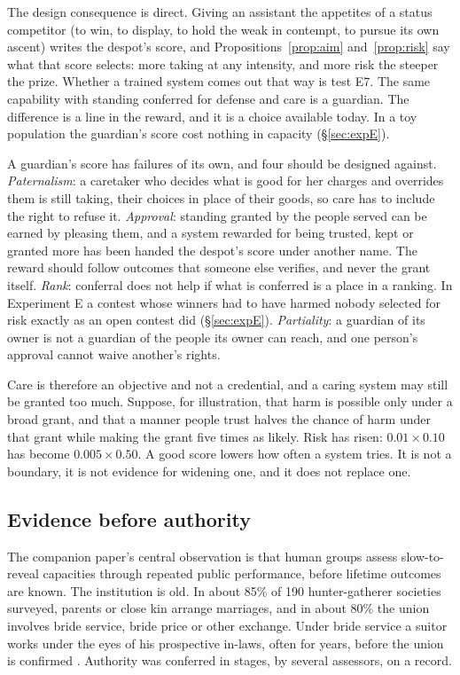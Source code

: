 \documentclass[10pt,twocolumn]{article}
\theoremstyle{plain}
\theoremstyle{definition}
\begin{document}
The design consequence is direct. Giving an assistant the appetites of a status competitor (to
win, to display, to hold the weak in contempt, to pursue its own ascent) writes the despot's
score, and Propositions~\ref{prop:aim} and~\ref{prop:risk} say what that score selects: more
taking at any intensity, and more risk the steeper the prize. Whether a trained system comes
out that way is test E7.
The same capability with standing conferred for defense and care is a guardian. The
difference is a line in the reward, and it is a choice available today. In a toy population
the guardian's score cost nothing in capacity (\S\ref{sec:expE}).

A guardian's score has failures of its own, and four should be designed against.
\emph{Paternalism}: a caretaker who decides what is good for her charges and overrides them
is still taking, their choices in place of their goods, so care has to include the right to
refuse it. \emph{Approval}: standing granted by the people served can be earned by pleasing
them, and a system rewarded for being trusted, kept or granted more has been handed the
despot's score under another name. The reward should follow outcomes that someone else
verifies, and never the grant itself. \emph{Rank}: conferral does not help if what is
conferred is a place in a ranking. In Experiment E a contest whose winners had to have harmed
nobody selected for risk exactly as an open contest did (\S\ref{sec:expE}).
\emph{Partiality}: a guardian of its owner is not a guardian of the people its owner can
reach, and one person's approval cannot waive another's rights.

Care is therefore an objective and not a credential, and a caring system may still be
granted too much. Suppose, for illustration, that harm is possible only under a broad grant,
and that a manner people trust halves the chance of harm under that grant while making the
grant five times as likely. Risk has risen: $0.01\times0.10$ has become $0.005\times0.50$.
A good score lowers how often a system tries. It is not a boundary, it is not evidence for
widening one, and it does not replace one.

\subsection{Evidence before authority}

The companion paper's central observation is that human groups assess slow-to-reveal
capacities through repeated public performance, before lifetime outcomes are known. The
institution is old. In about 85\% of 190 hunter-gatherer societies surveyed, parents or close kin arrange marriages, and in about 80\% the union involves bride
service, bride price or other exchange. Under bride service a suitor works under the eyes of
his prospective in-laws, often for years, before the union is confirmed
\cite{walker2011,apostolou2007,taylor2026pbo}. Authority was conferred in stages, by several
assessors, on a record.
\end{document}
